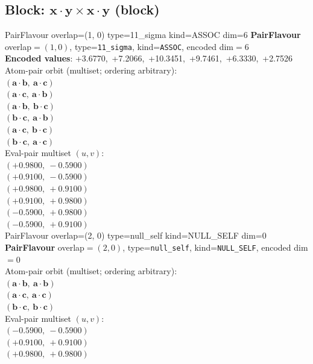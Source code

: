 \documentclass[a4paper,11pt]{article}
\newcommand{\pdcegfomjfhook}[2]{\mathbf{#1} \cdot \mathbf{#2}}
\begin{document}
\subsection{Block: $\pdcegfomjfhook{x}{y} \times \pdcegfomjfhook{x}{y}$  (block)}
    PairFlavour  overlap=(1, 0)  type=11\_sigma  kind=ASSOC  dim=6
\textbf{PairFlavour} overlap$=(1, 0)$, type=\texttt{11\_sigma}, kind=\texttt{ASSOC}, encoded dim$=6$\\
\textbf{      Encoded values}: +3.6770,\ +7.2066,\ +10.3451,\ +9.7461,\ +6.3330,\ +2.7526\\
\quad Atom-pair orbit (multiset; ordering arbitrary):\\
$(\pdcegfomjfhook{a}{b},\ \pdcegfomjfhook{a}{c})$\\
$(\pdcegfomjfhook{a}{c},\ \pdcegfomjfhook{a}{b})$\\
$(\pdcegfomjfhook{a}{b},\ \pdcegfomjfhook{b}{c})$\\
$(\pdcegfomjfhook{b}{c},\ \pdcegfomjfhook{a}{b})$\\
$(\pdcegfomjfhook{a}{c},\ \pdcegfomjfhook{b}{c})$\\
$(\pdcegfomjfhook{b}{c},\ \pdcegfomjfhook{a}{c})$\\
\quad Eval-pair multiset $(u, v)$:\\
$(+0.9800,\ -0.5900)$\\
$(+0.9100,\ -0.5900)$\\
$(+0.9800,\ +0.9100)$\\
$(+0.9100,\ +0.9800)$\\
$(-0.5900,\ +0.9800)$\\
$(-0.5900,\ +0.9100)$\\
    PairFlavour  overlap=(2, 0)  type=null\_self  kind=NULL\_SELF  dim=0
\textbf{PairFlavour} overlap$=(2, 0)$, type=\texttt{null\_self}, kind=\texttt{NULL\_SELF}, encoded dim$=0$\\
\quad Atom-pair orbit (multiset; ordering arbitrary):\\
$(\pdcegfomjfhook{a}{b},\ \pdcegfomjfhook{a}{b})$\\
$(\pdcegfomjfhook{a}{c},\ \pdcegfomjfhook{a}{c})$\\
$(\pdcegfomjfhook{b}{c},\ \pdcegfomjfhook{b}{c})$\\
\quad Eval-pair multiset $(u, v)$:\\
$(-0.5900,\ -0.5900)$\\
$(+0.9100,\ +0.9100)$\\
$(+0.9800,\ +0.9800)$\\
\end{document}
